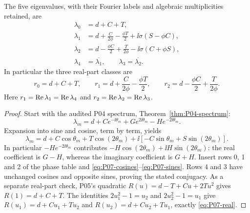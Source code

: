 \begin{theorem}
\label{thm:P07-spectrum}
The five eigenvalues, with their Fourier labels and algebraic
multiplicities retained, are
\begin{align}
 \lambda_0&=d+C+T,\label{eq:P07-spectrum}\\
 \lambda_1&=d+\frac{C}{2\phi}-\frac{\phi T}{2}
                +\ii\sigma(S-\phi C),\nonumber\\
 \lambda_2&=d-\frac{\phi C}{2}+\frac{T}{2\phi}
                -\ii\sigma(C+\phi S),\nonumber\\
 \lambda_4&=\overline{\lambda_1},\qquad
 \lambda_3=\overline{\lambda_2}.\nonumber
\end{align}
In particular the three real-part classes are
\begin{equation}
 r_0=d+C+T,\qquad
 r_1=d+\frac{C}{2\phi}-\frac{\phi T}{2},\qquad
 r_2=d-\frac{\phi C}{2}+\frac{T}{2\phi}.
 \label{eq:P07-real}
\end{equation}
Here $r_1=\operatorname{Re}\lambda_1=\operatorname{Re}\lambda_4$ and
$r_2=\operatorname{Re}\lambda_2=\operatorname{Re}\lambda_3$.
\end{theorem}
\begin{proof}
Start with the audited P04 spectrum, Theorem~\ref{thm:P04-spectrum}:
\[
 \lambda_m=d+Ce^{-\ii\theta_m}+Ge^{2\ii\theta_m}
                         -He^{-2\ii\theta_m}.
\]
Expansion into sine and cosine, term by term, yields
\[
 \lambda_m=d+C\cos\theta_m+T\cos(2\theta_m)
            +\ii[-C\sin\theta_m+S\sin(2\theta_m)].
\]
In particular $-He^{-2\ii\theta_m}$ contributes
$-H\cos(2\theta_m)+\ii H\sin(2\theta_m)$: the real coefficient
is $G-H$, whereas the imaginary coefficient is $G+H$.
Insert rows 0, 1 and 2 of the phase table and
\eqref{eq:P07-cosines}--\eqref{eq:P07-sines}. Rows 4 and 3 have
unchanged cosines and opposite sines, proving the stated conjugacy.
As a separate real-part check, P05's quadratic
$R(u)=d-T+Cu+2Tu^2$ gives $R(1)=d+C+T$.
The identities $2u_1^2-1=u_2$ and $2u_2^2-1=u_1$ give
$R(u_1)=d+Cu_1+Tu_2$ and $R(u_2)=d+Cu_2+Tu_1$,
exactly \eqref{eq:P07-real}.
\end{proof}

